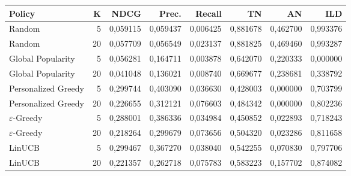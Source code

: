 \begin{tabular}{lrrrrrrr}
\toprule
Policy & K & NDCG & Prec. & Recall & TN & AN & ILD \\
\midrule
Random & 5 & 0,059115 & 0,059437 & 0,006425 & 0,881678 & 0,462700 & 0,993376 \\
Random & 20 & 0,057709 & 0,056549 & 0,023137 & 0,881825 & 0,469460 & 0,993287 \\
Global Popularity & 5 & 0,056281 & 0,164711 & 0,003878 & 0,642070 & 0,220333 & 0,000000 \\
Global Popularity & 20 & 0,041048 & 0,136021 & 0,008740 & 0,669677 & 0,238681 & 0,338792 \\
Personalized Greedy & 5 & 0,299744 & 0,403090 & 0,036630 & 0,428003 & 0,000000 & 0,703799 \\
Personalized Greedy & 20 & 0,226655 & 0,312121 & 0,076603 & 0,484342 & 0,000000 & 0,802236 \\
$\varepsilon$-Greedy & 5 & 0,288001 & 0,386336 & 0,034984 & 0,450852 & 0,022893 & 0,718243 \\
$\varepsilon$-Greedy & 20 & 0,218264 & 0,299679 & 0,073656 & 0,504320 & 0,023286 & 0,811658 \\
LinUCB & 5 & 0,299467 & 0,367270 & 0,038040 & 0,542255 & 0,070830 & 0,797706 \\
LinUCB & 20 & 0,221357 & 0,262718 & 0,075783 & 0,583223 & 0,157702 & 0,874082 \\
\bottomrule
\end{tabular}
